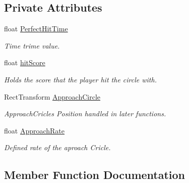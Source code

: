 \subsection*{Private Attributes}
\begin{DoxyCompactItemize}
\item 
\mbox{\label{class_osu_circle_aab3f795104cc3e0e96b533dc8d627bc6}} 
float \hyperlink{class_osu_circle_aab3f795104cc3e0e96b533dc8d627bc6}{Perfect\+Hit\+Time}
\begin{DoxyCompactList}\small\item\em Time trime value. \end{DoxyCompactList}\item 
\mbox{\label{class_osu_circle_ae1fc5ef284ed08000b50578259e69fc1}} 
float \hyperlink{class_osu_circle_ae1fc5ef284ed08000b50578259e69fc1}{hit\+Score}
\begin{DoxyCompactList}\small\item\em Holds the score that the player hit the circle with. \end{DoxyCompactList}\item 
\mbox{\label{class_osu_circle_aef5efb08c5ea74bd6875fda9456cd7d0}} 
Rect\+Transform \hyperlink{class_osu_circle_aef5efb08c5ea74bd6875fda9456cd7d0}{Approach\+Circle}
\begin{DoxyCompactList}\small\item\em Approach\+Cricle\textquotesingle{}s Position handled in later functions. \end{DoxyCompactList}\item 
\mbox{\label{class_osu_circle_a6770527fce5f357a3d4a25ff68bf64a4}} 
float \hyperlink{class_osu_circle_a6770527fce5f357a3d4a25ff68bf64a4}{Approach\+Rate}
\begin{DoxyCompactList}\small\item\em Defined rate of the aproach Cricle. \end{DoxyCompactList}\end{DoxyCompactItemize}


\subsection{Member Function Documentation}
\mbox{\label{class_osu_circle_ae655fb82998de93d7542cb77f3ad406b}} 
